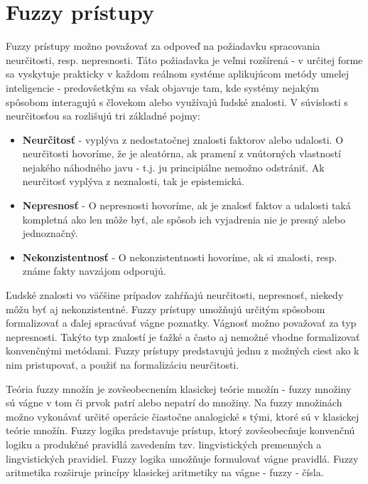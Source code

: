 \pagebreak
\section{Fuzzy prístupy}

Fuzzy prístupy možno považovať za odpoveď na požiadavku spracovania neurčitosti, resp. nepresnosti. Táto požiadavka je veľmi rozšírená - v určitej forme sa vyskytuje prakticky v každom reálnom systéme aplikujúcom metódy umelej inteligencie - predovšetkým sa však objavuje tam, kde systémy nejakým spôsobom interagujú s človekom alebo využívajú ľudské znalosti. 
V súvislosti s neurčitosťou sa rozlišujú tri základné pojmy: \cite{gregorRef13, gregorUI}  %
\begin{itemize}
	\item \textbf{Neurčitosť} - vyplýva z nedostatočnej znalosti faktorov alebo udalosti. O neurčitosti hovoríme, že je aleatórna, ak pramení z vnútorných vlastností nejakého náhodného javu - t.j. ju principiálne nemožno odstrániť. Ak neurčitosť vyplýva z neznalosti, tak je epistemická. 
	\item \textbf{Nepresnosť} - O nepresnosti hovoríme, ak je znalosť faktov a udalosti taká kompletná ako len môže byť, ale spôsob ich vyjadrenia nie je presný alebo jednoznačný. 
	\item \textbf{Nekonzistentnosť} - O nekonzistentnosti hovoríme, ak si znalosti, resp. známe fakty navzájom odporujú. 
\end{itemize}

Ľudské znalosti vo väčšine prípadov zahŕňajú neurčitosti, nepresnosť, niekedy môžu byť aj nekonzistentné. 
Fuzzy prístupy umožňujú určitým spôsobom formalizovať a ďalej spracúvať vágne poznatky. Vágnosť možno považovať za typ nepresnosti. 
 Takýto typ znalostí je ťažké a často aj nemožné vhodne formalizovať konvenčnými metódami. Fuzzy prístupy predstavujú jednu z možných ciest ako k nim pristupovať, a použiť na formalizáciu neurčitosti. \cite{gregorUI, gregorRef13}  

Teória fuzzy množín je zovšeobecnením klasickej teórie množín - fuzzy množiny sú vágne v tom či prvok patrí alebo nepatrí do množiny. 
Na fuzzy množinách možno vykonávať určité operácie čiastočne analogické s tými, ktoré sú v klasickej teórie množín. 
Fuzzy logika predstavuje prístup, ktorý zovšeobecňuje konvenčnú logiku a produkčné pravidlá zavedením tzv. lingvistických premenných a lingvistických pravidiel. 
Fuzzy logika umožňuje formulovať vágne pravidlá. 
Fuzzy aritmetika rozširuje princípy klasickej aritmetiky na vágne - fuzzy - čísla. \cite{gregorUI} 

